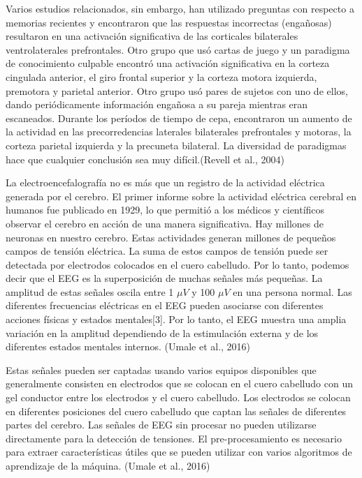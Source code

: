 Varios estudios relacionados, sin embargo, han utilizado preguntas con respecto a memorias recientes y encontraron que las respuestas incorrectas (engañosas) resultaron en una activación significativa de las corticales bilaterales ventrolaterales prefrontales. Otro grupo que usó cartas de juego y un paradigma de conocimiento culpable encontró una activación significativa en la corteza cingulada anterior, el giro frontal superior y la corteza motora izquierda, premotora y parietal anterior. Otro grupo usó pares de sujetos con uno de ellos, dando periódicamente información engañosa a su pareja mientras eran escaneados. Durante los períodos de tiempo de cepa, encontraron un aumento de la actividad en las precorredencias laterales bilaterales prefrontales y motoras, la corteza parietal izquierda y la precuneta bilateral. La diversidad de paradigmas hace que cualquier conclusión sea muy difícil.(Revell et al., 2004)

La electroencefalografía no es más que un registro de la actividad eléctrica generada por el cerebro. El primer informe sobre la actividad eléctrica cerebral en humanos fue publicado en 1929, lo que permitió a los médicos y científicos observar el cerebro en acción de una manera significativa. Hay millones de neuronas en nuestro cerebro. Estas actividades generan millones de pequeños campos de tensión eléctrica.  La suma de estos campos de tensión puede ser detectada por electrodos colocados en el cuero cabelludo.  Por lo tanto, podemos decir que el EEG es la superposición de muchas señales más pequeñas.  La amplitud de estas señales oscila entre 1 $\mu V$ y 100 $\mu V$ en una persona normal. Las diferentes frecuencias eléctricas en el EEG pueden asociarse con diferentes acciones físicas y estados mentales[3]. Por lo tanto, el EEG muestra una amplia variación en la amplitud dependiendo de la estimulación externa y de los diferentes estados mentales internos. (Umale et al., 2016)

Estas señales pueden ser captadas usando varios equipos disponibles que generalmente consisten en electrodos que se colocan en el cuero cabelludo con un gel conductor entre los electrodos y el cuero cabelludo.  Los electrodos se colocan en diferentes posiciones del cuero cabelludo que captan las señales de diferentes partes del cerebro. Las señales de EEG sin procesar no pueden utilizarse directamente para la detección de tensiones. El pre-procesamiento es necesario para extraer características útiles que se pueden utilizar con varios algoritmos de aprendizaje de la máquina. (Umale et al., 2016)

